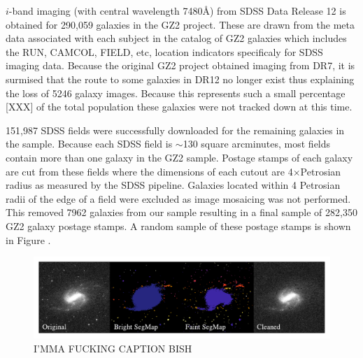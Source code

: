 $i$-band imaging (with central wavelength 7480\AA) from SDSS Data Release 12 is obtained for 290,059 galaxies in the GZ2 project. These are drawn from the meta data associated with each subject in the catalog of GZ2 galaxies which includes the RUN, CAMCOL, FIELD, etc, location indicators specificaly for SDSS imaging data. Because the original GZ2 project obtained imaging from DR7, it is surmised that the route to some galaxies in DR12 no longer exist thus explaining the loss of 5246 galaxy images. Because this represents such a small percentage [XXX] of the total population these galaxies were not tracked down at this time.

151,987 SDSS fields were successfully downloaded for the remaining galaxies in the sample. Because each SDSS field is $\sim$130 square arcminutes, most fields contain more than one galaxy in the GZ2 sample.  Postage stamps of each galaxy are cut from these fields where the dimensions of each cutout are 4$\times$Petrosian radius as measured by the SDSS pipeline. Galaxies located within 4 Petrosian radii of the edge of a field were excluded as image mosaicing was not performed. This removed 7962 galaxies from our sample resulting in a final sample of 282,350 GZ2 galaxy postage stamps. A random sample of these postage stamps is shown in Figure .  

\begin{figure}
\includegraphics[width=\textwidth]{Figures/sextractor_example.pdf}
\caption{I'MMA FUCKING CAPTION BISH}
\label{fig: segmaps}
\end{figure}


